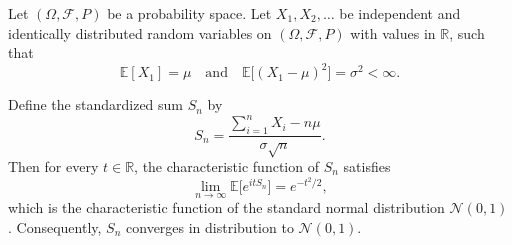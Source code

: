 \begin{theorem} \label{theorem:central_limit_theorem}
    Let $(\Omega, \mathcal{F}, P)$ be a probability space. Let $X_1, X_2, \dots$ be independent and identically distributed random variables on $(\Omega, \mathcal{F}, P)$ with values in $\mathbb{R}$, such that
    $$\mathbb{E}[X_1] = \mu \quad \text{and} \quad \mathbb{E}\bigl[(X_1 - \mu)^2\bigr] = \sigma^2 < \infty.$$

    Define the standardized sum $S_n$ by
    $$S_n = \frac{\sum_{i=1}^n X_i - n\mu}{\sigma\sqrt{n}}.$$
    Then for every $t \in \mathbb{R}$, the characteristic function of $S_n$ satisfies
    $$\lim_{n \to \infty} \mathbb{E}\bigl[e^{it S_n}\bigr] = e^{-t^2/2},$$
    which is the characteristic function of the standard normal distribution $\mathcal{N}(0, 1)$. Consequently, $S_n$ converges in distribution to $\mathcal{N}(0, 1)$.
\end{theorem}
